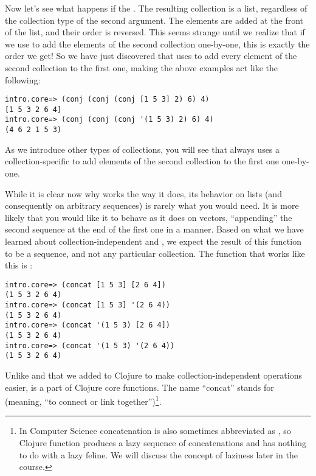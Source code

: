 Now let's see what happens if the . The resulting collection is a list, regardless of the collection type of the second argument. The elements are added at the front of the list, and their order is reversed. This seems strange until we realize that if we use  to add the elements of the second collection one-by-one, this is exactly the order we get! So we have just discovered that  uses  to add every element of the second collection to the first one, making the above examples act like the following: 
\begin{framed}
\begin{verbatim}
intro.core=> (conj (conj (conj [1 5 3] 2) 6) 4)
[1 5 3 2 6 4]
intro.core=> (conj (conj (conj '(1 5 3) 2) 6) 4)
(4 6 2 1 5 3)
\end{verbatim}
\end{framed}
As we introduce other types of collections, you will see that  always uses a collection-specific  to add elements of the second collection to the first one one-by-one. 

While it is clear now why  works the way it does, its behavior on lists (and consequently on arbitrary sequences) is rarely what you would need. It is more likely that you would like it to behave as it does on vectors, ``appending'' the second sequence at the end of the first one in a  manner. Based on what we have learned about collection-independent  and , we expect the result of this function to be a sequence, and not any particular collection. The function that works like this is :
\begin{framed}
\begin{verbatim}
intro.core=> (concat [1 5 3] [2 6 4])
(1 5 3 2 6 4)
intro.core=> (concat [1 5 3] '(2 6 4))
(1 5 3 2 6 4)
intro.core=> (concat '(1 5 3) [2 6 4])
(1 5 3 2 6 4)
intro.core=> (concat '(1 5 3) '(2 6 4))
(1 5 3 2 6 4)
\end{verbatim}
\end{framed}
Unlike  and  that we added to Clojure to make collection-independent operations easier,  is a part of Clojure core functions. The name ``concat'' stands for  (meaning, ``to connect or link together'')\footnote{In Computer Science concatenation is also sometimes abbreviated as , so Clojure function  produces a lazy sequence of concatenations and has nothing to do with a lazy feline. We will discuss the concept of laziness later in the course.}.

